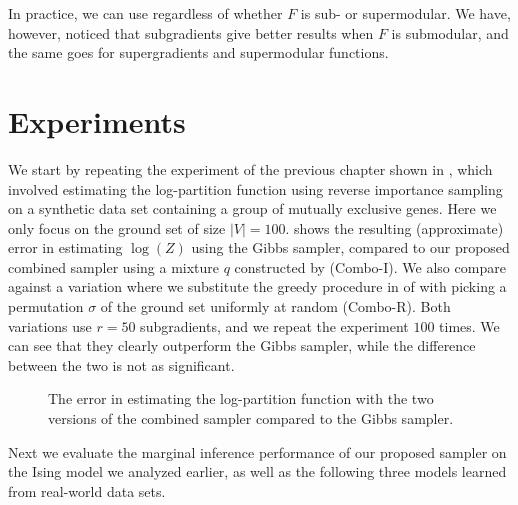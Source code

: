 
In practice, we can use  regardless of whether $F$ is sub- or supermodular.
We have, however, noticed that subgradients give better results when $F$ is submodular, and the same goes for supergradients and supermodular functions.


\section{Experiments}
We start by repeating the experiment of the previous chapter shown in , which involved estimating the log-partition function using reverse importance sampling on a synthetic data set containing a group of mutually exclusive genes.
Here we only focus on the ground set of size $|V| = 100$.
 shows the resulting (approximate) error in estimating $\log(Z)$ using the Gibbs sampler, compared to our proposed combined sampler using a mixture $q$ constructed by  (\textsf{Combo-I}).
We also compare against a variation where we substitute the greedy procedure in  of  with picking a permutation $\sigma$ of the ground set uniformly at random (\textsf{Combo-R}).
Both variations use $r = 50$ subgradients, and we repeat the experiment $100$ times.
We can see that they clearly outperform the Gibbs sampler, while the difference between the two is not as significant.

\setlength{}
\setlength{}
\begin{figure}[htb]
  \centering
  
  \caption{The error in estimating the log-partition function with the two versions of the combined sampler compared to the Gibbs sampler.}
  \label{fig:exp3}
\end{figure}

Next we evaluate the marginal inference performance of our proposed sampler on the Ising model we analyzed earlier, as well as the following three models learned from real-world data sets.
